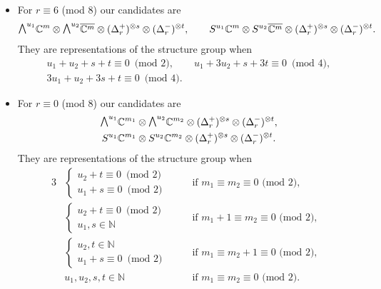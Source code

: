 \documentclass[pdftex]{sigma}
\newcommand{\ext}{\raise1pt\hbox{$\textstyle\bigwedge$}}
\newcommand{\sym}{S}
\numberwithin{equation}{section}
\begin{document}
\begin{itemize}
 \item For $r\equiv 6$ (mod 8) our candidates are
 \begin{gather*}\ext^{u_1} \mathbb{C}^{m}\otimes \ext^{u_2} \overline{\mathbb{C}^{m}}\otimes (\Delta_r^+)^{\otimes s}\otimes (\Delta_r^-)^{\otimes t},
 \qquad \sym^{u_1}\mathbb{C}^{m}\otimes \sym^{u_2}\overline{\mathbb{C}^{m}}\otimes (\Delta_r^+)^{\otimes s}\otimes (\Delta_r^-)^{\otimes t}.\end{gather*}
 They are representations of the structure group when
 \begin{gather*}
u_1+u_2+s+t \equiv 0 \,\,\,\mbox{(mod 2)},\qquad u_1+3u_2+s+3t \equiv 0 \,\,\,\mbox{(mod 4)},\\
3u_1+u_2+3s+t \equiv 0 \,\,\,\mbox{(mod 4)}.
 \end{gather*}

 \item For $r\equiv 0$ (mod 8) our candidates are
 \begin{gather*}\ext^{u_1} \mathbb{C}^{m_1}\otimes \ext^{u_2} \mathbb{C}^{m_2}\otimes (\Delta_r^+)^{\otimes s}\otimes (\Delta_r^-)^{\otimes t},\\
 \sym^{u_1}\mathbb{C}^{m_1}\otimes \sym^{u_2}\mathbb{C}^{m_2}\otimes (\Delta_r^+)^{\otimes s}\otimes (\Delta_r^-)^{\otimes t}.\end{gather*}
 They are representations of the structure group when
 \begin{alignat*}{3}
 & \begin{cases}
u_2+t\equiv 0 \,\,\,\mbox{(mod 2)} \\
u_1+s\equiv 0 \,\,\,\mbox{(mod 2)}
 \end{cases}
 \quad && \mbox{if $m_1\equiv m_2\equiv 0$ (mod 2)},& \\
& \begin{cases}
u_2+t\equiv 0 \,\,\,\mbox{(mod 2)} \\
u_1,s\in\mathbb{N}
 \end{cases}
 \quad & & \mbox{if $m_1+1\equiv m_2\equiv 0$ (mod 2)},& \\
& \begin{cases}
u_2,t\in\mathbb{N} \\
u_1+s\equiv 0 \,\,\,\mbox{(mod 2)}
 \end{cases}
 \quad && \mbox{if $m_1\equiv m_2+1\equiv 0$ (mod 2)},& \\
& u_1,u_2,s,t\in\mathbb{N}\quad && \mbox{if $m_1\equiv m_2\equiv 0$ (mod 2)}. &
 \end{alignat*}
\end{itemize}
\end{document}
